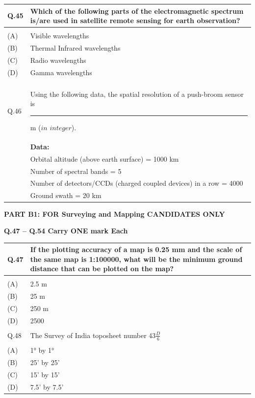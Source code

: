 \documentclass[12pt]{article}
\begin{document}
\begin{table}[H]
\renewcommand{\arraystretch}{3}
\setlength{\tabcolsep}{8pt}
\begin{tabular}{|l|p{15cm}|}
\hline
 
Q.45 & Which of the following parts of the electromagnetic spectrum is/are used in
satellite remote sensing for earth observation?\\ \hline 
 & \\ \hline
(A)&Visible wavelengths\\ \hline
(B)&Thermal Infrared wavelengths\\ \hline
(C)&Radio wavelengths\\ \hline
(D)&Gamma wavelengths\\ \hline
 & \\ \hline

Q.46& Using the following data, the spatial resolution of a push-broom sensor
is \rule{2cm}{0.15mm}m ($in$ $integer$).\\\hline
 & \textbf{Data:}\\
 & Orbital altitude (above earth surface) = 1000 km\\
 &Number of spectral bands = 5\\
 &Number of detectors/CCDs (charged coupled devices) in a row = 4000\\
 &Ground swath = 20 km\\\hline


\end{tabular}
\end{table}

\newpage

\textbf{PART B1: FOR Surveying and Mapping CANDIDATES ONLY} 

\textbf{Q.47 – Q.54 Carry ONE mark Each} \\

\begin{table}[H]
\renewcommand{\arraystretch}{3}
\setlength{\tabcolsep}{8pt}
\begin{tabular}{|l|p{15cm}|}
\hline
 
Q.47& If the plotting accuracy of a map is 0.25 mm and the scale of the same map is
1:100000, what will be the minimum ground distance that can be plotted on the
map?\\ \hline 
 & \\ \hline
(A)&2.5 m\\ \hline
(B)&25 m\\ \hline
(C)&250 m\\ \hline
(D)&2500\\ \hline
 & \\ \hline

Q.48 & The Survey of India toposheet number 43$\frac{D}{6}$ \\ \hline
 & \\ \hline
(A)&1° by 1°\\ \hline
(B)&25' by 25'\\ \hline
(C)&15' by 15'\\ \hline
(D)&7.5' by 7.5'\\ \hline

\end{tabular}
\end{table}
\end{document}
